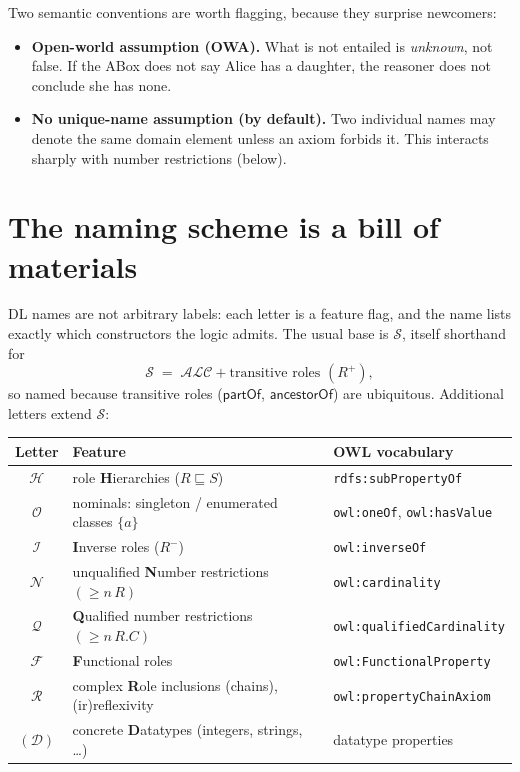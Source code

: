 \documentclass[11pt]{article}
\newcommand{\role}[1]{\ensuremath{\mathsf{#1}}}   %
\newcommand{\dl}[1]{\ensuremath{\mathcal{#1}}}%
\newcommand{\sub}{\sqsubseteq}
\theoremstyle{definition}
\begin{document}
Two semantic conventions are worth flagging, because they surprise newcomers:
\begin{itemize}[nosep]
  \item \textbf{Open-world assumption (OWA).} What is not entailed is
        \emph{unknown}, not false. If the ABox does not say Alice has a
        daughter, the reasoner does not conclude she has none.
  \item \textbf{No unique-name assumption (by default).} Two individual names
        may denote the same domain element unless an axiom forbids it. This
        interacts sharply with number restrictions (below).
\end{itemize}

\section{The naming scheme is a bill of materials}

DL names are not arbitrary labels: each letter is a feature flag, and the name
lists exactly which constructors the logic admits. The usual base is \dl{S},
itself shorthand for
\[
  \dl{S} \;=\; \dl{ALC} + \text{transitive roles } (R^{+}),
\]
so named because transitive roles (\role{partOf}, \role{ancestorOf}) are
ubiquitous. Additional letters extend \dl{S}:

\begin{center}
\begin{tabular}{@{}cll@{}}
\toprule
Letter & Feature & OWL vocabulary \\
\midrule
$\dl{H}$ & role \textbf{H}ierarchies ($R \sub S$)                 & \texttt{rdfs:subPropertyOf} \\
$\dl{O}$ & nominals: singleton / enumerated classes $\{a\}$        & \texttt{owl:oneOf}, \texttt{owl:hasValue} \\
$\dl{I}$ & \textbf{I}nverse roles ($R^{-}$)                        & \texttt{owl:inverseOf} \\
$\dl{N}$ & unqualified \textbf{N}umber restrictions $(\geq n\,R)$  & \texttt{owl:cardinality} \\
$\dl{Q}$ & \textbf{Q}ualified number restrictions $(\geq n\,R.C)$  & \texttt{owl:qualifiedCardinality} \\
$\dl{F}$ & \textbf{F}unctional roles                               & \texttt{owl:FunctionalProperty} \\
$\dl{R}$ & complex \textbf{R}ole inclusions (chains), (ir)reflexivity & \texttt{owl:propertyChainAxiom} \\
$(\dl{D})$ & concrete \textbf{D}atatypes (integers, strings, \dots) & datatype properties \\
\bottomrule
\end{tabular}
\end{center}
\end{document}
